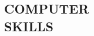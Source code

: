 \documentclass[margin, 10pt]{res} %
\begin{document}
\begin{resume}




\section{COMPUTER \\ SKILLS} 


\end{resume}
\end{document}
